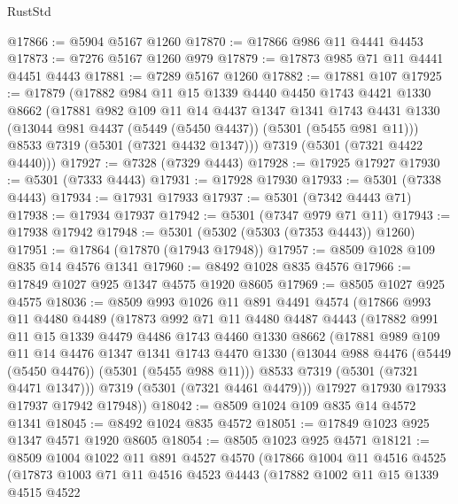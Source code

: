 \begin{lexlean}{RustStd}
\begin{coremodule}
@17866 := @5904 @5167 @1260
@17870 := @17866 @986 @11 @4441 @4453
@17873 := @7276 @5167 @1260 @979
@17879 := @17873 @985 @71 @11 @4441 @4451 @4443
@17881 := @7289 @5167 @1260
@17882 := @17881 @107
@17925 := @17879
    (@17882
      @984
      @11
      @15
      @1339
      @4440
      @4450
      @1743
      @4421
      @1330
      @8662
      (@17881
        @982
        @109
        @11
        @14
        @4437
        @1347
        @1341
        @1743
        @4431
        @1330
        (@13044 @981 @4437 (@5449 (@5450 @4437)) (@5301 (@5455 @981 @11)))
        @8533
        @7319
        (@5301 (@7321 @4432 @1347)))
      @7319
      (@5301 (@7321 @4422 @4440)))
@17927 := @7328 (@7329 @4443)
@17928 := @17925 @17927
@17930 := @5301 (@7333 @4443)
@17931 := @17928 @17930
@17933 := @5301 (@7338 @4443)
@17934 := @17931 @17933
@17937 := @5301 (@7342 @4443 @71)
@17938 := @17934 @17937
@17942 := @5301 (@7347 @979 @71 @11)
@17943 := @17938 @17942
@17948 := @5301 (@5302 (@5303 (@7353 @4443)) @1260)
@17951 := @17864 (@17870 (@17943 @17948))
@17957 := @8509 @1028 @109 @835 @14 @4576 @1341
@17960 := @8492 @1028 @835 @4576
@17966 := @17849 @1027 @925 @1347 @4575 @1920 @8605
@17969 := @8505 @1027 @925 @4575
@18036 := @8509
    @993
    @1026
    @11
    @891
    @4491
    @4574
    (@17866
      @993
      @11
      @4480
      @4489
      (@17873
        @992
        @71
        @11
        @4480
        @4487
        @4443
        (@17882
          @991
          @11
          @15
          @1339
          @4479
          @4486
          @1743
          @4460
          @1330
          @8662
          (@17881
            @989
            @109
            @11
            @14
            @4476
            @1347
            @1341
            @1743
            @4470
            @1330
            (@13044 @988 @4476 (@5449 (@5450 @4476)) (@5301 (@5455 @988 @11)))
            @8533
            @7319
            (@5301 (@7321 @4471 @1347)))
          @7319
          (@5301 (@7321 @4461 @4479)))
        @17927
        @17930
        @17933
        @17937
        @17942
        @17948))
@18042 := @8509 @1024 @109 @835 @14 @4572 @1341
@18045 := @8492 @1024 @835 @4572
@18051 := @17849 @1023 @925 @1347 @4571 @1920 @8605
@18054 := @8505 @1023 @925 @4571
@18121 := @8509
    @1004
    @1022
    @11
    @891
    @4527
    @4570
    (@17866
      @1004
      @11
      @4516
      @4525
      (@17873
        @1003
        @71
        @11
        @4516
        @4523
        @4443
        (@17882
          @1002
          @11
          @15
          @1339
          @4515
          @4522

\end{coremodule}
\end{lexlean}
